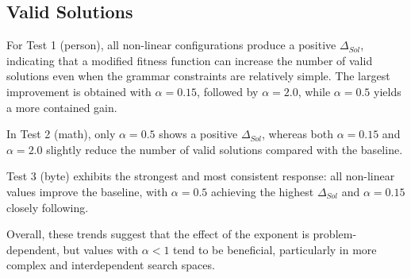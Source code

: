 \documentclass[conference]{IEEEtran}
\begin{document}
\subsection{Valid Solutions}
For Test 1 (person), all non-linear configurations produce a positive $\Delta_{Sol}$, indicating that a modified fitness function can increase the number of valid solutions even when the grammar constraints are relatively simple. The largest improvement is obtained with $\alpha=0.15$, followed by $\alpha=2.0$, while $\alpha=0.5$ yields a more contained gain.

In Test 2 (math), only $\alpha=0.5$ shows a positive $\Delta_{Sol}$, whereas both $\alpha=0.15$ and $\alpha=2.0$ slightly reduce the number of valid solutions compared with the baseline.

Test 3 (byte) exhibits the strongest and most consistent response: all non-linear values improve the baseline, with $\alpha=0.5$ achieving the highest $\Delta_{Sol}$ and $\alpha=0.15$ closely following.

Overall, these trends suggest that the effect of the exponent is problem-dependent, but values with $\alpha<1$ tend to be beneficial, particularly in more complex and interdependent search spaces.
\end{document}
